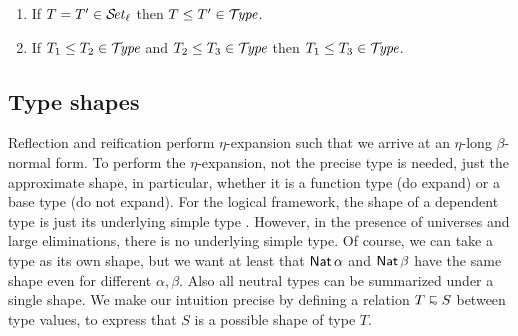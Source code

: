 \documentclass[acmlarge,review,anonymous]{acmart}\settopmatter{printfolios=true}
\begin{document}
\begin{lemma}
\label{lem:preord}
\bla
\begin{enumerate}
\item If\/ $T = T' \in \SET[\ell]$ then $T \leq T' \in \TYPE$.
\item If\/ $T_1 \leq T_2 \in \TYPE$ and $T_2 \leq T_3 \in \TYPE$ then $T_1 \leq T_3 \in \TYPE$.
\end{enumerate}
\end{lemma}





\subsection{Type shapes}
\label{sec:shape}

Reflection and reification perform $\eta$-expansion such that we arrive at an $\eta$-long $\beta$-normal form.  To perform the $\eta$-expansion, not the precise type is needed, just the approximate shape, in particular, whether it is a function type (do expand) or a base type (do not expand).
For the logical framework, the shape of a dependent type is just its
underlying simple type \cite{harperPfenning:equivalenceLF}. However,
in the presence of universes and large eliminations, there is no
underlying simple type.  Of course, we can take a type as its own
shape, but we want at least that $\Nat \alpha$ and $\Nat \beta$ have
the same shape even for different $\alpha, \beta$.
Also all neutral types can be summarized under a single shape.
We make our intuition precise by defining a relation $T \shape S$
between type values, to express that $S$ is a possible shape of type $T$.
\end{document}
